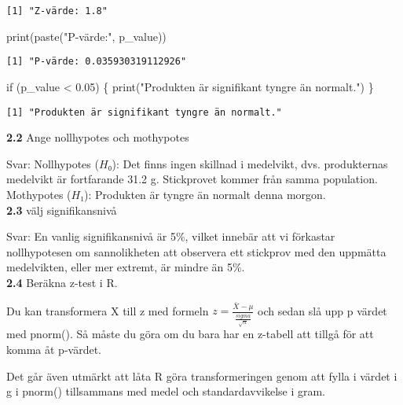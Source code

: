 \documentclass[
  letterpaper,
  DIV=11,
  numbers=noendperiod]{scrartcl}
\newenvironment{Shaded}{\begin{snugshade}}{\end{snugshade}}
\newcommand{\ControlFlowTok}[1]{\textcolor[rgb]{0.00,0.23,0.31}{#1}}
\newcommand{\FloatTok}[1]{\textcolor[rgb]{0.68,0.00,0.00}{#1}}
\newcommand{\FunctionTok}[1]{\textcolor[rgb]{0.28,0.35,0.67}{#1}}
\newcommand{\NormalTok}[1]{\textcolor[rgb]{0.00,0.23,0.31}{#1}}
\newcommand{\SpecialCharTok}[1]{\textcolor[rgb]{0.37,0.37,0.37}{#1}}
\newcommand{\StringTok}[1]{\textcolor[rgb]{0.13,0.47,0.30}{#1}}
\begin{document}
\begin{verbatim}
[1] "Z-värde: 1.8"
\end{verbatim}

\begin{Shaded}
\begin{Highlighting}[]
\FunctionTok{print}\NormalTok{(}\FunctionTok{paste}\NormalTok{(}\StringTok{"P{-}värde:"}\NormalTok{, p\_value))}
\end{Highlighting}
\end{Shaded}

\begin{verbatim}
[1] "P-värde: 0.035930319112926"
\end{verbatim}

\begin{Shaded}
\begin{Highlighting}[]
\ControlFlowTok{if}\NormalTok{ (p\_value }\SpecialCharTok{\textless{}} \FloatTok{0.05}\NormalTok{) \{}
  \FunctionTok{print}\NormalTok{(}\StringTok{"Produkten är signifikant tyngre än normalt."}\NormalTok{)}
\NormalTok{\}}
\end{Highlighting}
\end{Shaded}

\begin{verbatim}
[1] "Produkten är signifikant tyngre än normalt."
\end{verbatim}

\textbf{2.2} Ange nollhypotes och mothypotes

\hfill\break
Svar: Nollhypotes (\(H₀\)): Det finns ingen skillnad i medelvikt, dvs.
produkternas medelvikt är fortfarande 31.2 g. Stickprovet kommer från
samma population. Mothypotes (\(H₁\)): Produkten är tyngre än normalt
denna morgon.\\

\textbf{2.3} välj signifikansnivå

\hfill\break
Svar: En vanlig signifikansnivå är 5\%, vilket innebär att vi förkastar
nollhypotesen om sannolikheten att observera ett stickprov med den
uppmätta medelvikten, eller mer extremt, är mindre än 5\%.\\

\textbf{2.4} Beräkna z-test i R.

Du kan transformera X till z med formeln
\(z = \frac{\bar{X} - \mu}{\frac{sigma}{\sqrt{n}}}\) och sedan slå upp p
värdet med pnorm(). Så måste du göra om du bara har en z-tabell att
tillgå för att komma åt p-värdet.

Det går även utmärkt att låta R göra transformeringen genom att fylla i
värdet i g i pnorm() tillsammans med medel och standardavvikelse i gram.
\end{document}
